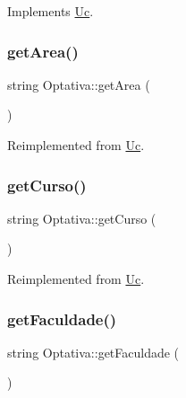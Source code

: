 Implements \hyperlink{class_uc_a9a64416600c67469a285d97a20050dd4}{Uc}.

\hypertarget{class_optativa_a3f02a824fbfaf7ad5f395b9bd9037ef3}{}\label{class_optativa_a3f02a824fbfaf7ad5f395b9bd9037ef3} 
\subsubsection{\texorpdfstring{get\+Area()}{getArea()}}
{\footnotesize\ttfamily string Optativa\+::get\+Area (\begin{DoxyParamCaption}{ }\end{DoxyParamCaption})\hspace{0.3cm}{\ttfamily [virtual]}}



Reimplemented from \hyperlink{class_uc_a98e8e68278a1cfb628662ab3d613410f}{Uc}.

\hypertarget{class_optativa_a79d38d1290190327c812c3eb16f310f6}{}\label{class_optativa_a79d38d1290190327c812c3eb16f310f6} 
\subsubsection{\texorpdfstring{get\+Curso()}{getCurso()}}
{\footnotesize\ttfamily string Optativa\+::get\+Curso (\begin{DoxyParamCaption}{ }\end{DoxyParamCaption})\hspace{0.3cm}{\ttfamily [virtual]}}



Reimplemented from \hyperlink{class_uc_a30c8b684d775a3d8304fcafefea2b951}{Uc}.

\hypertarget{class_optativa_a647029a53dd8c9c5b997730e57981a05}{}\label{class_optativa_a647029a53dd8c9c5b997730e57981a05} 
\subsubsection{\texorpdfstring{get\+Faculdade()}{getFaculdade()}}
{\footnotesize\ttfamily string Optativa\+::get\+Faculdade (\begin{DoxyParamCaption}{ }\end{DoxyParamCaption})\hspace{0.3cm}{\ttfamily [virtual]}}



